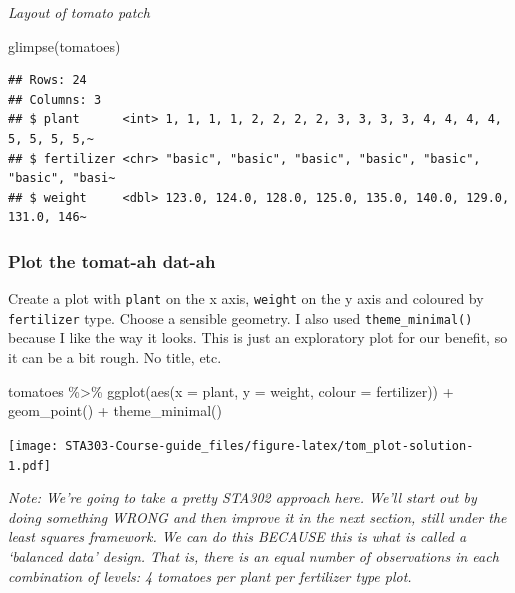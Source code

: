 \documentclass[
  openany]{book}
\newenvironment{Shaded}{\begin{snugshade}}{\end{snugshade}}
\newcommand{\AttributeTok}[1]{\textcolor[rgb]{0.77,0.63,0.00}{#1}}
\newcommand{\FunctionTok}[1]{\textcolor[rgb]{0.00,0.00,0.00}{#1}}
\newcommand{\NormalTok}[1]{#1}
\newcommand{\SpecialCharTok}[1]{\textcolor[rgb]{0.00,0.00,0.00}{#1}}
\begin{document}
\emph{Layout of tomato patch}

\begin{Shaded}
\begin{Highlighting}[]
\FunctionTok{glimpse}\NormalTok{(tomatoes)}
\end{Highlighting}
\end{Shaded}

\begin{verbatim}
## Rows: 24
## Columns: 3
## $ plant      <int> 1, 1, 1, 1, 2, 2, 2, 2, 3, 3, 3, 3, 4, 4, 4, 4, 5, 5, 5, 5,~
## $ fertilizer <chr> "basic", "basic", "basic", "basic", "basic", "basic", "basi~
## $ weight     <dbl> 123.0, 124.0, 128.0, 125.0, 135.0, 140.0, 129.0, 131.0, 146~
\end{verbatim}

\hypertarget{plot-the-tomat-ah-dat-ah}{%
\subsubsection{Plot the tomat-ah dat-ah}\label{plot-the-tomat-ah-dat-ah}}

Create a plot with \texttt{plant} on the x axis, \texttt{weight} on the y axis and coloured by \texttt{fertilizer} type. Choose a sensible geometry. I also used \texttt{theme\_minimal()} because I like the way it looks. This is just an exploratory plot for our benefit, so it can be a bit rough. No title, etc.

\begin{Shaded}
\begin{Highlighting}[]
\NormalTok{tomatoes }\SpecialCharTok{\%\textgreater{}\%} 
  \FunctionTok{ggplot}\NormalTok{(}\FunctionTok{aes}\NormalTok{(}\AttributeTok{x =}\NormalTok{ plant, }\AttributeTok{y =}\NormalTok{ weight, }\AttributeTok{colour =}\NormalTok{ fertilizer)) }\SpecialCharTok{+}
  \FunctionTok{geom\_point}\NormalTok{() }\SpecialCharTok{+}
  \FunctionTok{theme\_minimal}\NormalTok{()}
\end{Highlighting}
\end{Shaded}

\texttt{[image: STA303-Course-guide\_files/figure-latex/tom\_plot-solution-1.pdf]}

\emph{Note: We're going to take a pretty STA302 approach here. We'll start out by doing something WRONG and then improve it in the next section, still under the least squares framework. We can do this BECAUSE this is what is called a `balanced data' design. That is, there is an equal number of observations in each combination of levels: 4 tomatoes per plant per fertilizer type plot.}
\end{document}
